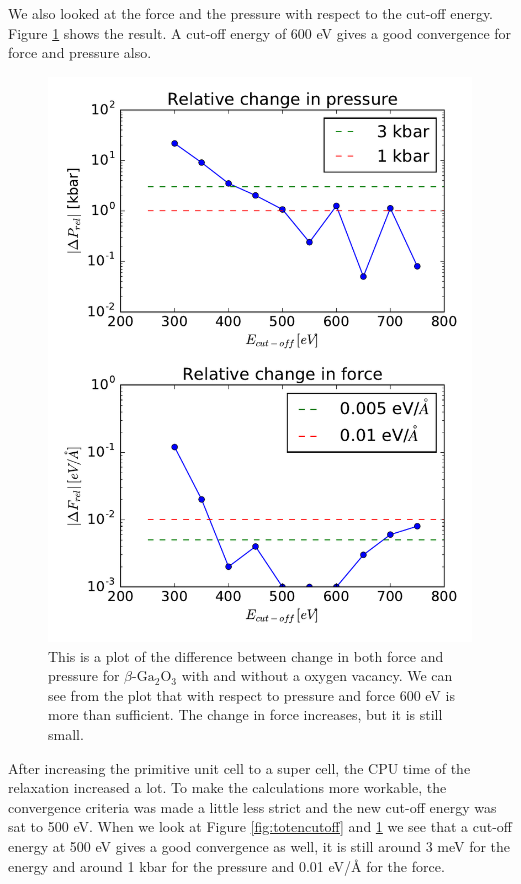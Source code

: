We also looked at the force and the pressure with respect to the cut-off energy. Figure \ref{fig:forcepresscutoff} shows the result. A cut-off energy of 600 eV gives a good convergence for force and pressure also. 

\begin{figure}[H]
\includegraphics[width=\linewidth]{../fig/deltaforcepressrel.pdf}\caption{This is a plot of the difference between change in both force and pressure for $\beta \text{-Ga}_2\text{O}_3$ with and without a oxygen vacancy. We can see from the plot that with respect to pressure and force 600 eV is more than sufficient. The change in force increases, but it is still small.}\label{fig:forcepresscutoff}
\end{figure}

After increasing the primitive unit cell to a super cell, the CPU time of the relaxation increased a lot. To make the calculations more workable, the convergence criteria was made a little less strict and the new cut-off energy was sat to 500 eV. When we look at Figure \ref{fig:totencutoff} and \ref{fig:forcepresscutoff} we see that a cut-off energy at 500 eV gives a good convergence as well, it is still around 3 meV for the energy and around 1 kbar for the pressure and 0.01 eV/Å for the force.

